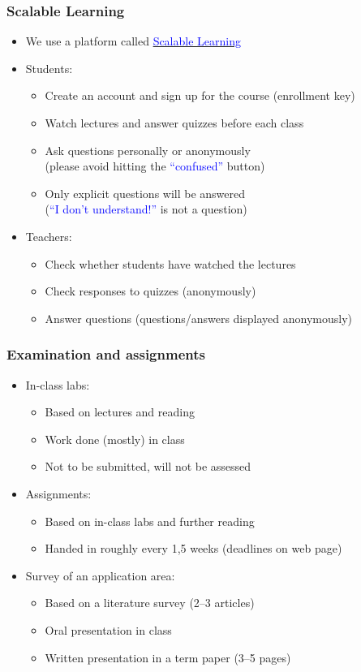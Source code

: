 \documentclass[dvipsnames]{beamer}
\begin{document}
\begin{frame}
\frametitle{Scalable Learning}
\begin{itemize}
\item We use a platform called \href{http://www.scalable-learning.com/\#/users/login}{\textcolor{blue}{Scalable Learning}}
\item Students:
\begin{itemize}
\item Create an account and sign up for the course (\alert{enrollment key})
\item Watch lectures and answer quizzes before each class
\item Ask questions personally or anonymously \\(please avoid hitting
  the \textcolor{blue}{``confused''} button)
\item Only explicit questions will be answered
  \\(\textcolor{blue}{``I don't understand!''} is not a
  question)
\end{itemize}
\item Teachers:
\begin{itemize}
\item Check whether students have watched the lectures
\item Check responses to quizzes (anonymously)
\item Answer questions (questions/answers displayed anonymously)
\end{itemize}
\end{itemize}
\end{frame}

\begin{frame}
\frametitle{Examination and assignments}
\begin{itemize}
\item In-class labs:
  \begin{itemize}
  \item Based on lectures and reading
  \item Work done (mostly) in class
  \item Not to be submitted, will not be assessed
  \end{itemize}
\item<2-> Assignments:
  \begin{itemize}
  \item Based on in-class labs and further reading
  \item Handed in roughly every 1,5 weeks (deadlines on web page)
  \end{itemize}
\item<3-> Survey of an application area:
  \begin{itemize}
  \item Based on a literature survey (2--3 articles)
  \item Oral presentation in class
  \item Written presentation in a term paper (3--5 pages)
  \end{itemize}
\end{itemize}
\end{frame}
\end{document}
